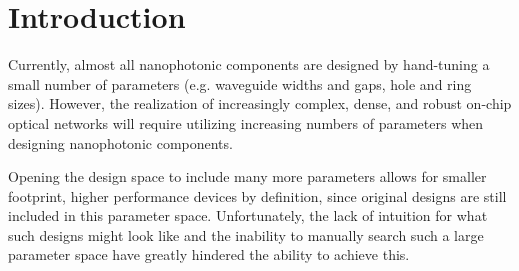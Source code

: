 \documentclass[letterpaper,10pt]{article}
\begin{document}
\begin{thebibliography}{99}
\end{thebibliography}

\section{Introduction}
Currently, almost all nanophotonic components are designed 
    by hand-tuning a small number of parameters 
    (e.g. waveguide widths and gaps, hole and ring sizes).
However, the realization of 
    increasingly complex, dense, and robust on-chip optical networks
    will require utilizing increasing numbers of parameters
    when designing nanophotonic components.

Opening the design space to include many more parameters
    allows for smaller footprint, higher performance devices by definition,
    since original designs are still included in this parameter space.
Unfortunately, the lack of intuition for what such designs might look like and
    the inability to manually search such a large parameter space
    have greatly hindered the ability to achieve this.
\end{document}
